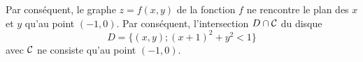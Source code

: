 {\begin{enumerate}
{		Par conséquent, le graphe
		$z=f(x,y)$ de la fonction $f$ ne rencontre le plan des $x$ et $y$ qu'au point
		$(-1,0)$. Par cons\'equent, l'intersection 
		$D \cap \cal C$ du disque
		\[
		D=\{(x,y); (x+1)^2+y^2<1\}
		\]
		avec $\cal C$ ne consiste qu'au point $(-1,0)$.}
	
\end{enumerate}}
